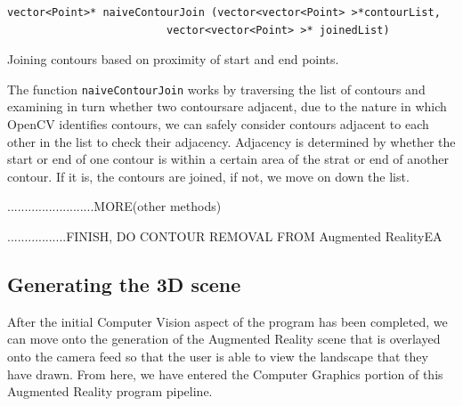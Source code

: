 \documentclass[11pt]{article}
\begin{document}
\begin{verbatim}
vector<Point>* naiveContourJoin (vector<vector<Point> >*contourList, 
                         vector<vector<Point> >* joinedList)
\end{verbatim}

\begin{algorithm}
\DontPrintSemicolon
{}
\caption{Joining contours based on proximity of start and end points.}
\label{algo:naivecontourjoin}
\end{algorithm}

The function \texttt{naiveContourJoin} works by traversing the list of 
contours and examining in turn whether two contoursare adjacent, due to 
the nature in which OpenCV identifies contours, we can safely consider 
contours adjacent to each other in the list to check their adjacency. 
Adjacency is determined by whether the start or end of one contour is within
a certain area of the strat or end of another contour. If it is, the 
contours are joined, if not, we move on down the list.

.........................MORE(other methods)


.................FINISH, DO CONTOUR REMOVAL FROM Augmented RealityEA


\subsection{Generating the 3D scene}
\label{3dgen}
After the initial Computer Vision aspect of the program has been completed,
we can move onto the generation of the Augmented Reality scene that is
overlayed onto the camera feed so that the user is able to view the
landscape that they have drawn. From here, we have entered the Computer
Graphics portion of this Augmented Reality program pipeline.
\end{document}
